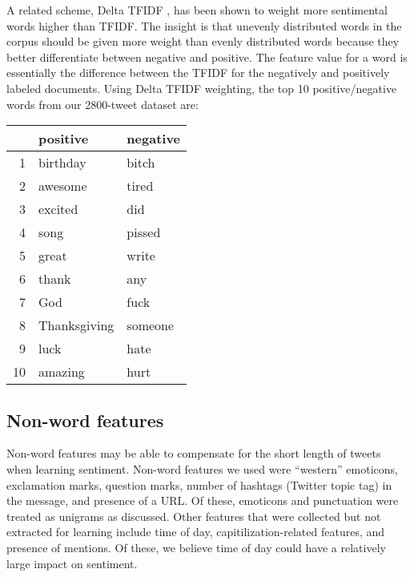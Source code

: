 A related scheme, Delta TFIDF \cite{Martineau:2009}, has been shown
to weight more sentimental words higher than TFIDF. The insight is that
unevenly distributed words in the corpus should be given more weight
than evenly distributed words because they better differentiate
between negative and positive. The feature value for a word is
essentially the difference between the TFIDF for the negatively and
positively labeled documents. Using Delta TFIDF weighting, the top 10
positive/negative words from our 2800-tweet dataset are:
\begin{table}[ht]
    \begin{center}
        \begin{tabular}{rll}
            \hline
            & positive & negative \\ 
            \hline
            1 & birthday & bitch \\ 
            2 & awesome & tired \\ 
            3 & excited & did \\ 
            4 & song & pissed \\ 
            5 & great & write \\ 
            6 & thank & any \\ 
            7 & God & fuck \\ 
            8 & Thanksgiving & someone \\ 
            9 & luck & hate \\ 
            10 & amazing & hurt \\ 
            \hline
        \end{tabular}
    \end{center}
\end{table}


\subsection{Non-word features}

Non-word features may be able to compensate for the short length of
tweets when learning sentiment. Non-word features we used were
``western'' emoticons, exclamation marks, question marks, number of
hashtags (Twitter topic tag) in the message, and presence of a URL. Of
these, emoticons and punctuation were treated as unigrams as
discussed. Other features that were collected but not extracted for
learning include time of day, capitilization-related features, and
presence of mentions. Of these, we believe time of day could have a
relatively large impact on sentiment. 
